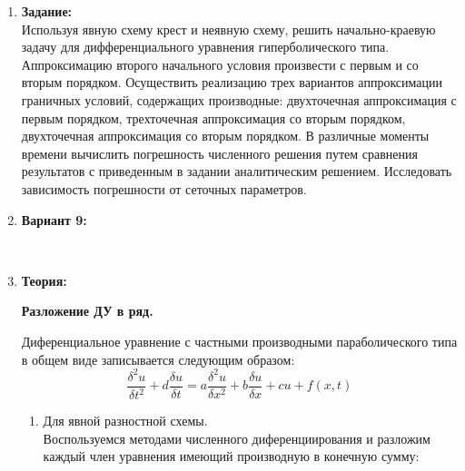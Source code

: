 \documentclass[12pt]{article}
\begin{document}
    \pagestyle{fancy} 
        \fancyhead{}
    \fancyfoot{} 
    \begin{enumerate}
        \item \textbf{Задание:}\\
        Используя явную схему крест и неявную схему, решить начально-краевую задачу для дифференциального уравнения гиперболического 
        типа. Аппроксимацию второго начального условия произвести с первым 
        и со вторым порядком. Осуществить реализацию трех вариантов 
        аппроксимации граничных условий, содержащих производные: 
        двухточечная аппроксимация с первым
        порядком, трехточечная аппроксимация со вторым порядком, 
        двухточечная аппроксимация со вторым порядком. В различные моменты 
        времени вычислить погрешность численного решения путем сравнения 
        результатов с приведенным в задании аналитическим решением. 
        Исследовать зависимость погрешности от сеточных параметров.
        \item \textbf{Вариант 9:}\\
        \begin{figure}[h]
            \label{ris:image}
        \end{figure}\\
        \item \textbf{Теория:}\\
        \begin{center}  \textbf{Разложение ДУ в ряд.} \end{center}
    Диференциальное уравнение с частными производными параболического типа в общем виде записывается следующим образом: 
    $$\frac{\delta^2 u}{\delta t^2}+ d\frac{\delta u}{\delta t}=a\frac{\delta^2 u}{\delta x^2}+b\frac{\delta u}{\delta x}+cu+f(x,t)$$
    \begin{enumerate}
    \item Для явной разностной схемы.
        \\Воспользуемся методами численного диференциирования и разложим каждый член уравнения имеющий производную в конечную сумму:

\end{enumerate}
\end{enumerate}
\end{document}
